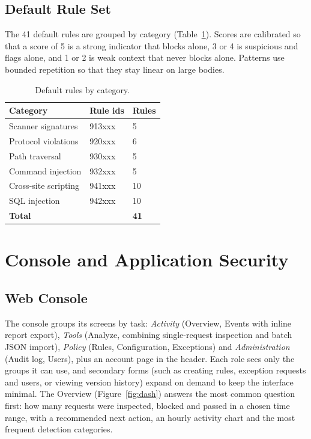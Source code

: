 \documentclass{FastFyp}
\begin{document}
\section{Default Rule Set}
The 41 default rules are grouped by category (Table~\ref{tab:rules}). Scores are calibrated so that a score of 5 is a strong indicator that blocks alone, 3 or 4 is suspicious and flags alone, and 1 or 2 is weak context that never blocks alone. Patterns use bounded repetition so that they stay linear on large bodies.

\begin{table}[!h]
\centering
\caption{Default rules by category.}
{\small\singlespacing\renewcommand{\arraystretch}{1.3}
\begin{tabular}{|p{4.6cm}|p{2.8cm}|p{1.8cm}|}
\hline
\textbf{Category} & \textbf{Rule ids} & \textbf{Rules} \\
\hline
Scanner signatures & 913xxx & 5 \\
\hline
Protocol violations & 920xxx & 6 \\
\hline
Path traversal & 930xxx & 5 \\
\hline
Command injection & 932xxx & 5 \\
\hline
Cross-site scripting & 941xxx & 10 \\
\hline
SQL injection & 942xxx & 10 \\
\hline
\textbf{Total} & & \textbf{41} \\
\hline
\end{tabular}}
\label{tab:rules}
\end{table}

\chapter{Console and Application Security}
\section{Web Console}
The console groups its screens by task: \emph{Activity} (Overview, Events with inline report export), \emph{Tools} (Analyze, combining single-request inspection and batch JSON import), \emph{Policy} (Rules, Configuration, Exceptions) and \emph{Administration} (Audit log, Users), plus an account page in the header. Each role sees only the groups it can use, and secondary forms (such as creating rules, exception requests and users, or viewing version history) expand on demand to keep the interface minimal. The Overview (Figure~\ref{fig:dash}) answers the most common question first: how many requests were inspected, blocked and passed in a chosen time range, with a recommended next action, an hourly activity chart and the most frequent detection categories.
\end{document}
